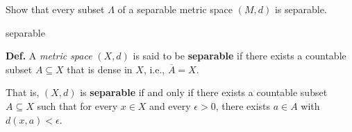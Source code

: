 \documentclass[UTF8,a4paper,10pt]{article}
\begin{document}



\pagebreak

\begin{Problem}[]{}

    Show that every subset \(\Lambda\) of a separable metric space \((M, d)\) is separable.

\end{Problem}


\begin{mybox}{separable}



\textbf{Def.} A \emph{metric space} \((X, d)\) is said to be \textbf{separable} if there exists a countable subset \(A \subseteq X\) that is dense in \(X\), i.e., \(\overline{A} = X\). 

That is, \((X, d)\) is \textbf{separable} if and only if there exists a countable subset \(A \subseteq X\) such that for  every \(x \in X\) and every \(\epsilon > 0\), there exists \(a \in A\) with \(d(x, a) < \epsilon\).

\end{mybox}




 
 
 



\end{document}
